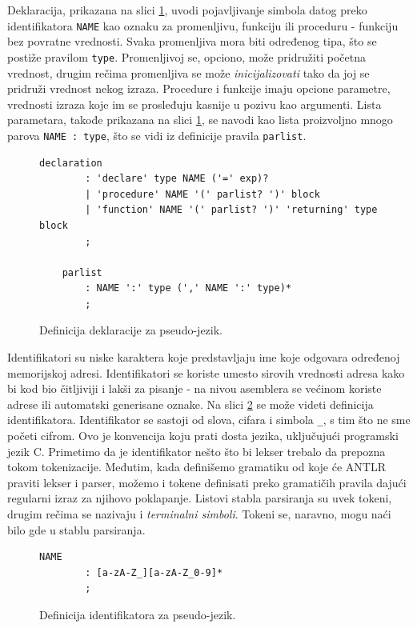 Deklaracija, prikazana na slici \ref{fig:PseudoDef3}, uvodi pojavljivanje simbola datog preko identifikatora \texttt{NAME} kao oznaku za promenljivu, funkciju ili proceduru - funkciju bez povratne vrednosti. Svaka promenljiva mora biti određenog tipa, što se postiže pravilom \texttt{type}. Promenljivoj se, opciono, može pridružiti početna vrednost, drugim rečima promenljiva se može \emph{inicijalizovati} tako da joj se pridruži vrednost nekog izraza. Procedure i funkcije imaju opcione parametre, vrednosti izraza koje im se prosleđuju kasnije u pozivu kao argumenti. Lista parametara, takođe prikazana na slici \ref{fig:PseudoDef3}, se navodi kao lista proizvoljno mnogo parova \texttt{NAME : type}, što se vidi iz definicije pravila \texttt{parlist}.

\begin{figure}[h!]
    \begin{lstlisting}[language={}]
    declaration
        : 'declare' type NAME ('=' exp)? 
        | 'procedure' NAME '(' parlist? ')' block 
        | 'function' NAME '(' parlist? ')' 'returning' type block 
        ;

    parlist
        : NAME ':' type (',' NAME ':' type)*
        ;
    \end{lstlisting}
    \caption{Definicija deklaracije za pseudo-jezik.}
    \label{fig:PseudoDef3}
\end{figure}

Identifikatori su niske karaktera koje predstavljaju ime koje odgovara određenoj memorijskoj adresi. Identifikatori se koriste umesto sirovih vrednosti adresa kako bi kod bio čitljiviji i lakši za pisanje - na nivou asemblera se većinom koriste adrese ili automatski generisane oznake. Na slici \ref{fig:PseudoDef4} se može videti definicija identifikatora. Identifikator se sastoji od slova, cifara i simbola \texttt{\_}, s tim što ne sme početi cifrom. Ovo je konvencija koju prati dosta jezika, uključujući programski jezik C. Primetimo da je identifikator nešto što bi lekser trebalo da prepozna tokom tokenizacije. Međutim, kada definišemo gramatiku od koje će ANTLR praviti lekser i parser, možemo i tokene definisati preko gramatičih pravila dajući regularni izraz za njihovo poklapanje. Listovi stabla parsiranja su uvek tokeni, drugim rečima se nazivaju i \emph{terminalni simboli}. Tokeni se, naravno, mogu naći bilo gde u stablu parsiranja.

\begin{figure}[h!]
    \begin{lstlisting}[language={}]
    NAME
        : [a-zA-Z_][a-zA-Z_0-9]*
        ;
    \end{lstlisting}
    \caption{Definicija identifikatora za pseudo-jezik.}
    \label{fig:PseudoDef4}
\end{figure}

